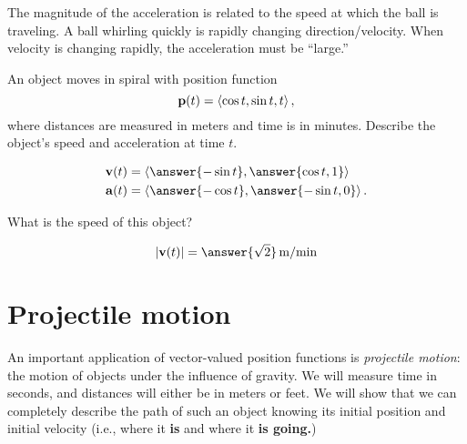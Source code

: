 \documentclass{ximera}
\begin{document}
\begin{example}
\begin{explanation}
  The magnitude of the acceleration is related to the speed at which
  the ball is traveling. A ball whirling quickly is rapidly changing
  direction/velocity. When velocity is changing rapidly, the
  acceleration must be ``large.''
\end{explanation}
\end{example}

\begin{question}
  An object moves in spiral with position function
  \[
  \mathbf{p}(t) = \left\langle \cos t, \sin t, t\right\rangle,
  \]
  where distances are measured in meters and time is in
  minutes. Describe the object's speed and acceleration at time $t$.
  \begin{prompt}
    \begin{align*}
      \vec{v}(t) &= \vector{\answer{-\sin t}, \answer{\cos t, 1}}  \\
      \vec{a}(t) &= \vector{\answer{-\cos t}, \answer{-\sin t, 0}}.
    \end{align*}
  \end{prompt}
  \begin{question}
    What is the speed of this object?
    \begin{prompt}
    \[
    |\vec{v}(t)| = \answer{\sqrt{2}}\unit{m/min}
    \]
    \end{prompt}
  \end{question}
\end{question}
              
\section{Projectile motion}

An important application of vector-valued position functions is
\textit{projectile motion}: the motion of objects under the influence
of gravity. We will measure time in seconds, and distances will either
be in meters or feet. We will show that we can completely describe the
path of such an object knowing its initial position and initial
velocity (i.e., where it \textbf{is} and where it \textbf{is going.})
\end{document}
